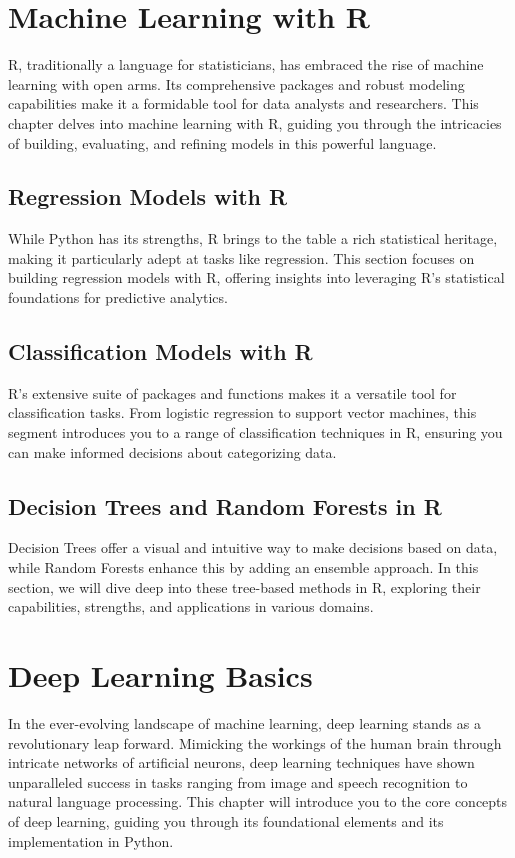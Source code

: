 \documentclass{book}
\begin{document}
\chapter{Machine Learning with R}
R, traditionally a language for statisticians, has embraced the rise of machine learning with open arms. Its comprehensive packages and robust modeling capabilities make it a formidable tool for data analysts and researchers. This chapter delves into machine learning with R, guiding you through the intricacies of building, evaluating, and refining models in this powerful language.

\section{Regression Models with R}
While Python has its strengths, R brings to the table a rich statistical heritage, making it particularly adept at tasks like regression. This section focuses on building regression models with R, offering insights into leveraging R's statistical foundations for predictive analytics.

\section{Classification Models with R}
R's extensive suite of packages and functions makes it a versatile tool for classification tasks. From logistic regression to support vector machines, this segment introduces you to a range of classification techniques in R, ensuring you can make informed decisions about categorizing data.

\section{Decision Trees and Random Forests in R}
Decision Trees offer a visual and intuitive way to make decisions based on data, while Random Forests enhance this by adding an ensemble approach. In this section, we will dive deep into these tree-based methods in R, exploring their capabilities, strengths, and applications in various domains.

\chapter{Deep Learning Basics}
In the ever-evolving landscape of machine learning, deep learning stands as a revolutionary leap forward. Mimicking the workings of the human brain through intricate networks of artificial neurons, deep learning techniques have shown unparalleled success in tasks ranging from image and speech recognition to natural language processing. This chapter will introduce you to the core concepts of deep learning, guiding you through its foundational elements and its implementation in Python.
\end{document}
